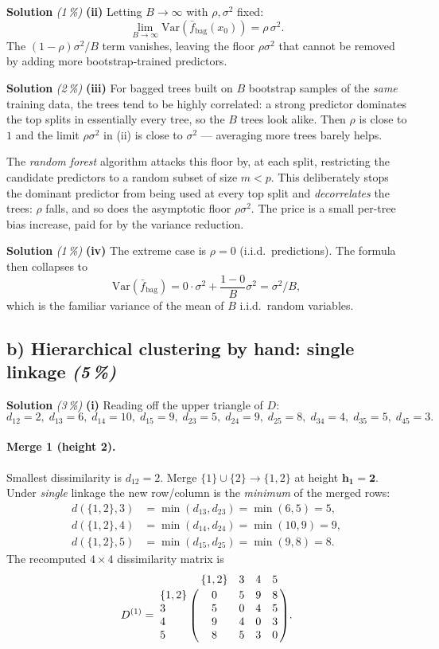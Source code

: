 \documentclass[11pt,a4paper]{article}
\newcommand{\subpoints}[1]{\textit{(#1\,\%)}}
\newcommand{\sol}{\noindent\textbf{Solution}}
\begin{document}
\medskip
\sol{} \subpoints{1} \textbf{(ii)} Letting $B\to\infty$ with $\rho,\sigma^2$ fixed:
$$\lim_{B\to\infty}\mathrm{Var}\!\left(\bar f_{\text{bag}}(x_0)\right) = \boxed{\rho\,\sigma^2}.$$
The $(1-\rho)\sigma^2/B$ term vanishes, leaving the floor $\rho\sigma^2$ that cannot be removed by adding
more bootstrap-trained predictors.

\medskip
\sol{} \subpoints{2} \textbf{(iii)} For bagged trees built on $B$ bootstrap samples of the \emph{same} training
data, the trees tend to be highly correlated: a strong predictor dominates the top splits in essentially
every tree, so the $B$ trees look alike. Then $\rho$ is close to $1$ and the limit $\rho\sigma^2$ in (ii)
is close to $\sigma^2$ --- averaging more trees barely helps.

The \emph{random forest} algorithm attacks this floor by, at each split, restricting the candidate predictors
to a random subset of size $m<p$. This deliberately stops the dominant predictor from being used at every
top split and \emph{decorrelates} the trees: $\rho$ falls, and so does the asymptotic floor $\rho\sigma^2$.
The price is a small per-tree bias increase, paid for by the variance reduction.

\medskip
\sol{} \subpoints{1} \textbf{(iv)} The extreme case is $\rho=0$ (i.i.d.\ predictions). The formula then
collapses to
$$\mathrm{Var}\!\left(\bar f_{\text{bag}}\right) = 0\cdot\sigma^2 + \frac{1-0}{B}\sigma^2 = \boxed{\sigma^2/B},$$
which is the familiar variance of the mean of $B$ i.i.d.\ random variables.

\subsection*{b) Hierarchical clustering by hand: single linkage \subpoints{5}}

\sol{} \subpoints{3} \textbf{(i)} Reading off the upper triangle of $D$:
$$d_{12}=2,\;d_{13}=6,\;d_{14}=10,\;d_{15}=9,\;d_{23}=5,\;d_{24}=9,\;d_{25}=8,\;d_{34}=4,\;d_{35}=5,\;d_{45}=3.$$

\paragraph{Merge 1 (height 2).} Smallest dissimilarity is $d_{12}=2$. Merge $\{1\}\cup\{2\}\to\{1,2\}$
at height $\mathbf{h_1=2}$. Under \emph{single} linkage the new row/column is the \emph{minimum} of the merged rows:
\begin{align*}
d(\{1,2\},3) &= \min(d_{13},d_{23}) = \min(6,5) = 5, \\
d(\{1,2\},4) &= \min(d_{14},d_{24}) = \min(10,9) = 9, \\
d(\{1,2\},5) &= \min(d_{15},d_{25}) = \min(9,8) = 8.
\end{align*}
The recomputed $4\times 4$ dissimilarity matrix is
$$D^{(1)} = \bordermatrix{
       & \{1,2\} & 3 & 4 & 5 \cr
\{1,2\}& 0       & 5 & 9 & 8 \cr
3      & 5       & 0 & 4 & 5 \cr
4      & 9       & 4 & 0 & 3 \cr
5      & 8       & 5 & 3 & 0 }.$$
\end{document}
